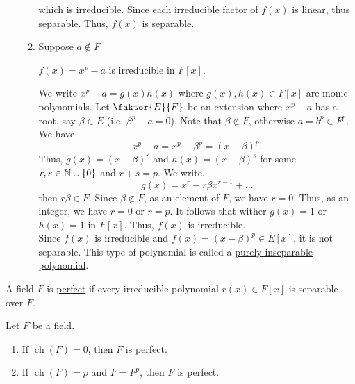 \documentclass[11pt]{article}
\newcommand{\quotient}[2]{\faktor{#1}{#2}}
\DeclareMathOperator{\ch}{ch}
\begin{document}
\begin{example}
\begin{enumerate}[(1)]
\begin{enumerate}[(3.1)]
\begin{equation*}
\end{equation*}
which is irreducible. Since each irreducible factor of $f(x)$ is linear, thus
separable. Thus, $f(x)$ is separable.
\item Suppose $a \not\in F$
\begin{claim}
$f(x) = x^p -a$ is irreducible in $F[x]$.
\end{claim}
We write $x^p - a = g(x)h(x)$ where $g(x),h(x) \in F[x]$ are monic polynomials.
Let $\quotient{E}{F}$ be an extension where $x^p - a$ has a root, say $\beta \in
E$ (i.e. $\beta^p - a = 0$). Note that $\beta \not\in F$, otherwise $a = b^p \in
F^p$. We have
\begin{equation*}
x^p -a = x^p - \beta^p = (x - \beta)^p. \tag{by Binomial Theorem}
\end{equation*}
Thus, $g(x) = (x - \beta)^r$ and $h(x) = (x - \beta)^s$ for some $r,s \in \mathbb{N}
\cup \{0\}$ and $r+s = p$. We write,
\begin{equation*}
g(x) = x^r - r\beta x^{r-1} + \dots
\end{equation*}
then $r\beta \in F$. Since $\beta \not\in F$, as an element of $F$, we have $r =
0$. Thus, as an integer, we have $r = 0$ or $r = p$. It follows that wither
$g(x) = 1$ or $h(x) = 1$ in $F[x]$. Thus, $f(x)$ is irreducible.\\

Since $f(x)$ is irreducible and $f(x) = (x-\beta)^p \in E[x]$, it is not
separable. This type of polynomial is called a \underline{purely inseparable
polynomial}.
\end{enumerate}
\end{enumerate}
\end{example}
\begin{definition}
A field $F$ is \underline{perfect} if every irreducible polynomial $r(x) \in
F[x]$ is separable over $F$.
\end{definition}
\begin{theorem}
Let $F$ be a field.
\begin{enumerate}
\item If $\ch(F) = 0$, then $F$ is perfect.
\item If $\ch(F) = p$ and $F = F^p$, then $F$ is perfect.
\end{enumerate}
\label{theorem26}
\end{theorem}
\end{document}

